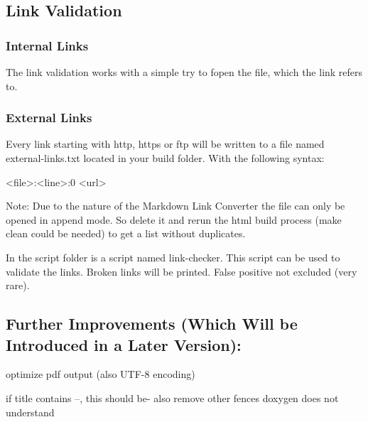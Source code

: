 \subsection*{Link Validation}

\subsubsection*{Internal Links}

The link validation works with a simple try to {\ttfamily fopen} the file, which the link refers to.

\subsubsection*{External Links}

Every link starting with {\ttfamily http}, {\ttfamily https} or {\ttfamily ftp} will be written to a file named {\ttfamily external-\/links.\+txt} located in your build folder. With the following syntax\+:


\begin{DoxyCode}
<file>:<line>:0 <url>
\end{DoxyCode}


Note\+: Due to the nature of the Markdown Link Converter the file can only be opened in append mode. So delete it and rerun the html build process ({\ttfamily make clean} could be needed) to get a list without duplicates.

In the script folder is a script named {\ttfamily link-\/checker}. This script can be used to validate the links. Broken links will be printed. False positive not excluded (very rare).

\subsection*{Further Improvements (Which Will be Introduced in a Later Version)\+:}


\begin{DoxyItemize}
\item optimize pdf output (also U\+T\+F-\/8 encoding)
\item if title contains --, this should be-\/ also remove other fences doxygen does not understand 
\end{DoxyItemize}
